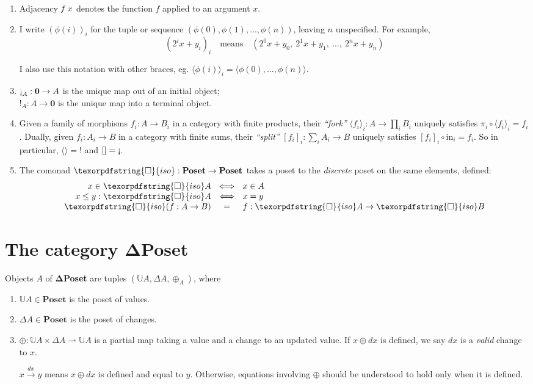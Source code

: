 \documentclass{rntz}\usepackage[a5]{rntzgeometry}\usepackage[fullwidth=13cm,width=320pt,width=115mm]{narrow}
\newcommand\mathvar[1]{\ensuremath{#1}} %
\newcommand\cat\textbf
\newcommand\CP{\cat{\texorpdfstring{$\boldsymbol\Delta$Poset}{DeltaPoset}}}
\newcommand\Poset{\cat{Poset}}
\newcommand\initO{\ensuremath{\mathbold{0}}}
\newcommand\initE{\mathop{\text{\textexclamdown}}}
\newcommand\termI{\mathop{!}}
\newcommand\D\Delta
\newcommand\x\times
\newcommand\pto\rightharpoonup
\newcommand\injc{\text{in}}
\newcommand\<{\mskip 4mu plus 4mu minus 1mu}
\newcommand\dx{\mathvar{dx}}
\newcommand\iso{{\texorpdfstring{\ensuremath{\square}}{iso}}}
\newcommand\isof{\iso}
\newcommand\valfn{\ensuremath{\mathbb{U}}}
\newcommand\vals{\valfn}
\newcommand\chgs[1]{\D{#1}}
\newcommand\upd{\mathbin{\oplus}}
\newcommand\updfn{\ensuremath{{\upd}}}
\newcommand\fork[1]{\langle{#1}\rangle}
\newcommand\krof[1]{[{#1}]}
\newcommand\validarrow\to
\newcommand\valid[1]{\mathrel{\overset{#1}{\validarrow}}}
\newcommand\vld[3]{{#2 \valid{#1} #3}}
\begin{document}
\begin{enumerate}
\item Adjacency $f\<x$ denotes the function $f$ applied to an argument $x$.

  \newcommand\iexpr{\phi}
\item I write $(\iexpr(i))_i$ for the tuple or sequence $(\iexpr(0), \iexpr(1),
  ..., \iexpr(n))$, leaving $n$ unspecified. For example,
  \[ (2^ix + y_i)_i \quad\text{means}\quad
  (2^0x + y_0,~ 2^1x + y_1,~ ...,~ 2^nx + y_n) \]

  \noindent
  I also use this notation with other braces, eg. $\fork{\iexpr(i)}_i =
  \fork{\iexpr(0), ..., \iexpr(n)}$.

\item $\initE_A : \initO \to A$ is the unique map out of an initial object;\\
  $\termI_A : A \to \initO$ is the unique map into a terminal object.

\item Given a family of morphisms $f_i : A \to B_i$ in a category with finite
  products, their \emph{``fork''} $\fork{f_i}_i : A \to \textstyle\prod_{i} B_i$
  uniquely satisfies $\pi_i \circ \fork{f_i}_i = f_i$. Dually, given $f_i : A_i
  \to B$ in a category with finite sums, their \emph{``split''} $\krof{f_i}_i :
  \sum_i A_i \to B$ uniquely satisfies $\krof{f_i}_i \circ \injc_i = f_i$. So in
  particular, $\fork{} = \termI$ and $\krof{} = \initE$.

\item The comonad $\iso : \Poset \to \Poset$ takes a poset to the
  \emph{discrete} poset on the same elements, defined:
  \[\setlength\arraycolsep{.33em}
  \begin{array}{rcl}
    x \in \isof A &\iff& x \in A\\
    x \le y : \isof A &\iff& x = y\\
    \isof(f : A \to B) &=& f : \isof A \to \isof B
  \end{array}\]
\end{enumerate}


\section{The category \CP}

Objects $A$ of \CP{} are tuples $(\vals A, \chgs A, \updfn_A)$, where
%
\begin{enumerate}
\item $\vals A \in \Poset$ is the poset of values.

\item $\chgs A \in \Poset$ is the poset of changes.

\item $\updfn : \vals A \x \chgs A \pto \vals A$ is a partial map taking a value
  and a change to an updated value. If $x \upd \dx$ is defined, we say $\dx$ is a
  \emph{valid} change to $x$.

  $\vld{\dx} x y$ means $x \upd \dx$ is defined and equal to $y$. Otherwise,
  equations inv\-olv\-ing \updfn{} should be understood to hold only when it is
  defined.
\end{enumerate}
\end{document}
